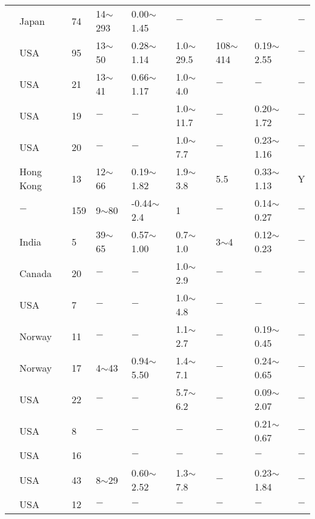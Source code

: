 {\begin{longtable}{lllllllll}
    \citet{Koumoto2001701} & Japan & 74    & 14$\sim$293 & 0.00$\sim$1.45 & $-$     & $-$     & $-$     & $-$ \\
    \citet{Koutsoftas1976989} & USA   & 95    & 13$\sim$50 & 0.28$\sim$1.14 & 1.0$\sim$29.5 & 108$\sim$414 & 0.19$\sim$2.55 & $-$ \\
    \citet{Koutsoftas1978609} & USA   & 21    & 13$\sim$41 & 0.66$\sim$1.17 & 1.0$\sim$4.0 & $-$     & $-$     & $-$ \\
    \citet{Koutsoftas1981254} & USA   & 19    & $-$     & $-$     & 1.0$\sim$11.7 & $-$     & 0.20$\sim$1.72 & $-$ \\
    \citet{Koutsoftas1985337} & USA   & 20    & $-$     & $-$     & 1.0$\sim$7.7 & $-$     & 0.23$\sim$1.16 & $-$ \\
    \citet{Koutsoftas198787} & Hong Kong & 13    & 12$\sim$66 & 0.19$\sim$1.82 & 1.9$\sim$3.8 & 5.5   & 0.33$\sim$1.13 & Y \\
    \citet{Kulhawy1990} & $-$     & 159   & 9$\sim$80  & -0.44$\sim$2.4 & 1     & $-$     & 0.14$\sim$0.27 & $-$ \\
    \citet{Kulkarani1967210} & India & 5     & 39$\sim$65 & 0.57$\sim$1.00 & 0.7$\sim$1.0 & 3$\sim$4   & 0.12$\sim$0.23 & $-$ \\
    \citet{Lacasse1977367} & Canada & 20    & $-$     & $-$     & 1.0$\sim$2.9 & $-$     & $-$     & $-$ \\
          & USA   & 7     & $-$     & $-$     & 1.0$\sim$4.8 & $-$     & $-$     & $-$ \\
    \citet{Lacasse1981507} & Norway & 11    & $-$     & $-$     & 1.1$\sim$2.7 & $-$     & 0.19$\sim$0.45 & $-$ \\
    \citet{Lacasse1985887} & Norway & 17    & 4$\sim$43  & 0.94$\sim$5.50 & 1.4$\sim$7.1 & $-$     & 0.24$\sim$0.65 & $-$ \\
    \citet{Ladd1964103} & USA   & 22    & $-$     & $-$     & 5.7$\sim$6.2 & $-$     & 0.09$\sim$2.07 & $-$ \\
    \citet{Ladd1965282} & USA   & 8     & $-$     & $-$     & $-$     & $-$     & 0.21$\sim$0.67 & $-$ \\
    \citet{Ladd1967112} & USA   & 16    &       & $-$     & $-$     & $-$     & $-$     & $-$ \\
    \citet{Ladd1972101} & USA   & 43    & 8$\sim$29  & 0.60$\sim$2.52 & 1.3$\sim$7.8 & $-$     & 0.23$\sim$1.84 & $-$ \\
    \citet{Ladd1973108} & USA   & 12    & $-$     & $-$     & $-$     & $-$     & $-$     & $-$ \\

\end{longtable}}
